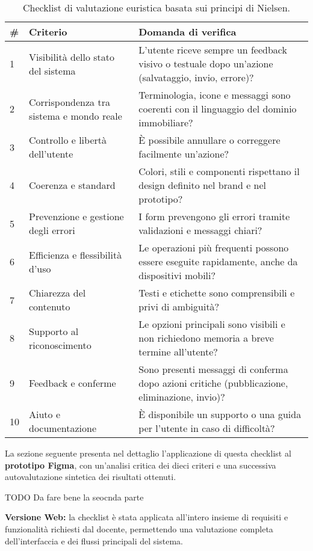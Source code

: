 \begin{table}[H]
\centering
\begin{tabular}{p{0.7cm} p{4cm} p{8cm}}
\hline
\textbf{\#} & \textbf{Criterio} & \textbf{Domanda di verifica} \\
\hline
1 & Visibilità dello stato del sistema & L’utente riceve sempre un feedback visivo o testuale dopo un’azione (salvataggio, invio, errore)? \\
2 & Corrispondenza tra sistema e mondo reale & Terminologia, icone e messaggi sono coerenti con il linguaggio del dominio immobiliare? \\
3 & Controllo e libertà dell’utente & È possibile annullare o correggere facilmente un’azione? \\
4 & Coerenza e standard & Colori, stili e componenti rispettano il design definito nel brand e nel prototipo? \\
5 & Prevenzione e gestione degli errori & I form prevengono gli errori tramite validazioni e messaggi chiari? \\
6 & Efficienza e flessibilità d’uso & Le operazioni più frequenti possono essere eseguite rapidamente, anche da dispositivi mobili? \\
7 & Chiarezza del contenuto & Testi e etichette sono comprensibili e privi di ambiguità? \\
8 & Supporto al riconoscimento & Le opzioni principali sono visibili e non richiedono memoria a breve termine all’utente? \\
9 & Feedback e conferme & Sono presenti messaggi di conferma dopo azioni critiche (pubblicazione, eliminazione, invio)? \\
10 & Aiuto e documentazione & È disponibile un supporto o una guida per l’utente in caso di difficoltà? \\
\hline
\end{tabular}
\caption{Checklist di valutazione euristica basata sui principi di Nielsen.}
\end{table}

\bigskip

La sezione seguente presenta nel dettaglio l’applicazione di questa checklist al \textbf{prototipo Figma}, con un’analisi critica dei dieci criteri e una successiva autovalutazione sintetica dei risultati ottenuti.




TODO Da fare bene la seocnda parte 

\textbf{Versione Web:} la checklist è stata applicata all’intero insieme di requisiti e funzionalità richiesti dal docente, permettendo una valutazione completa dell’interfaccia e dei flussi principali del sistema.

